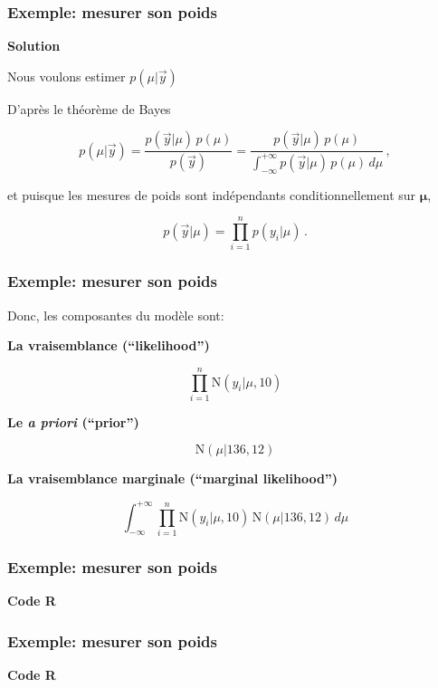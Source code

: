 \documentclass{beamer}
\begin{document}
\begin{frame}
    \frametitle{Exemple: mesurer son poids}
    \textbf{Solution}

    \vfill

    Nous voulons estimer $p(\mu | \vec{y})$

    \pause

    \vfill

    D'après le théorème de Bayes

    \[p(\mu | \vec{y}) = \frac{p(\vec{y} | \mu) \, p(\mu)}{p(\vec{y})} 
      = \frac{p(\vec{y} | \mu) \, p(\mu)}{\int_{-\infty}^{+\infty} p(\vec{y} | \mu) \, p(\mu) \, d\mu} \, ,\]

    \pause

    et puisque les mesures de poids sont indépendants conditionnellement sur $\boldsymbol{\mu}$,

    \[p(\vec{y} | \mu) = \prod_{i=1}^{n} p(y_i | \mu) \, .\]
\end{frame}


\begin{frame}
    \frametitle{Exemple: mesurer son poids}
    Donc, les composantes du modèle sont:

    \pause

    \vfill

    \textbf{La vraisemblance (``likelihood'')}

    \[\prod_{i=1}^{n} \textrm{N}(y_i | \mu, 10)\]

    \pause

    \vfill

    \textbf{Le \emph{a priori} (``prior'')}

    \[\textrm{N}(\mu | 136, 12)\]

    \pause

    \vfill

    \textbf{La vraisemblance marginale (``marginal likelihood'')}

    \[\int_{-\infty}^{+\infty} \prod_{i=1}^{n} \textrm{N}(y_i | \mu, 10) \, \textrm{N}(\mu | 136, 12) \, d\mu\]
\end{frame}


\begin{frame}[fragile]
    \frametitle{Exemple: mesurer son poids}
    \textbf{Code R}
    \fontsize{9}{11}\selectfont
    
\end{frame}


\begin{frame}[fragile]
    \frametitle{Exemple: mesurer son poids}
    \textbf{Code R}
    \fontsize{9}{11}\selectfont
    
\end{frame}
\end{document}
